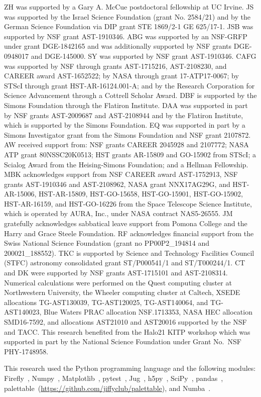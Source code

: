 \documentclass[fleqn,usenatbib]{mnras}
\begin{document}
ZH was supported by a Gary A. McCue postdoctoral fellowship at UC Irvine.
JS was supported by the Israel Science Foundation (grant No. 2584/21) and by the German Science Foundation via DIP grant STE 1869/2-1 GE 625/17-1. 
JSB was supported by NSF grant AST-1910346.
ABG was supported by an NSF-GRFP under grant DGE-1842165 and was additionally supported by NSF grants DGE-0948017 and DGE-145000.
SY was supported by NSF grant AST-1910346.
CAFG was supported by NSF through grants AST-1715216, AST-2108230,  and CAREER award AST-1652522; by NASA through grant 17-ATP17-0067; by STScI through grant HST-AR-16124.001-A; and by the Research Corporation for Science Advancement through a Cottrell Scholar Award.
DBF is supported by the Simons Foundation through the Flatiron Institute.
DAA was supported in part by NSF grants AST-2009687 and AST-2108944 and by the Flatiron Institute, which is supported by the Simons Foundation.
EQ was supported in part by a Simons Investigator grant from the Simons Foundation and NSF grant 2107872.
AW received support from: NSF grants CAREER 2045928 and 2107772; NASA ATP grant 80NSSC20K0513; HST grants AR-15809 and GO-15902 from STScI; a Scialog Award from the Heising-Simons Foundation; and a Hellman Fellowship.
MBK acknowledges support from NSF CAREER award AST-1752913, NSF grants AST-1910346 and AST-2108962, NASA grant NNX17AG29G, and HST-AR-15006, HST-AR-15809, HST-GO-15658, HST-GO-15901, HST-GO-15902, HST-AR-16159, and HST-GO-16226 from the Space Telescope Science Institute, which is operated by AURA, Inc., under NASA contract NAS5-26555.
JM gratefully acknowledges sabbatical leave support from Pomona College and the Harry and Grace Steele Foundation.
RF acknowledges financial support from the Swiss National Science Foundation (grant no PP00P2\_194814 and 200021\_188552).
TKC is supported by Science and Technology Facilities Council (STFC) astronomy consolidated grant ST/P000541/1 and ST/T000244/1.
CT and DK were supported by NSF grants AST-1715101 and  AST-2108314.
Numerical calculations were performed on the Quest computing cluster at Northwestern University, the Wheeler computing cluster at Caltech, XSEDE allocations TG-AST130039, TG-AST120025, TG-AST140064, and TG-AST140023, Blue Waters PRAC allocation NSF.1713353, NASA HEC allocation SMD16-7592, and allocations AST21010 and AST20016 supported by the NSF and TACC.
This research benefited from the Halo21 KITP workshop which was supported in part by the National Science Foundation under Grant No.~NSF PHY-1748958.

This research used the Python programming language and the following modules:
Firefly~\citep{Geller2018},
Numpy~\citep{Harris2020},
Matplotlib~\citep{Hunter2007},
pytest~\citep{pytest3.4},
Jug~\citep{Coelho2017},
h5py~\citep{h5py},
SciPy~\citep{Virtanen2020},
pandas~\citep{McKinney2010,Reback2020},
palettable~(\url{https://github.com/jiffyclub/palettable}),
and Numba~\citep{Lam2015}.
\end{document}
